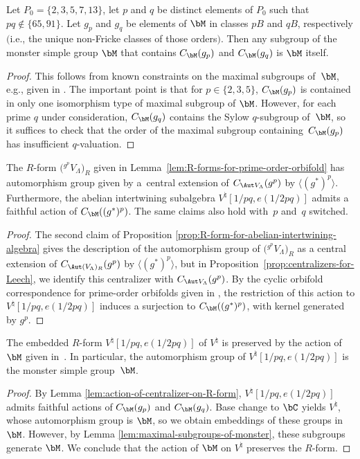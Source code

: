 \begin{lem} \label{lem:maximal-subgroups-of-monster}
Let $P_0 = \{ 2,3,5,7,13\}$, let $p$ and $q$ be distinct elements of $P_0$ such that $pq \not\in \{65, 91\}$. Let $g_p$ and $g_q$ be elements of $\bM$ in classes $pB$ and $qB$, respectively $($i.e., the unique non-Fricke classes of those orders$)$. Then any subgroup of the monster simple group $\bM$ that contains $C_\bM(g_p)$ and $C_\bM(g_q)$ is $\bM$ itself.
\end{lem}
\begin{proof}This follows from known constraints on the maximal subgroups of~$\bM$, e.g., given in \cite{W17}. The important point is that for $p \in \{2,3,5\}$, $C_\bM(g_p)$ is contained in only one isomorphism type of maximal subgroup of $\bM$. However, for each prime $q$ under consideration, $C_\bM(g_q)$ contains the Sylow $q$-subgroup of~$\bM$, so it suffices to check that the order of the maximal subgroup containing~$C_\bM(g_p)$ has insufficient $q$-valuation.
\end{proof}

\begin{lem} \label{lem:action-of-centralizer-on-R-form}The $R$-form $\big({}^{g^p}V_\Lambda\big)_R$ given in Lemma~{\rm \ref{lem:R-forms-for-prime-order-orbifold}} has automorphism group given by a~central extension of $C_{\Aut V_\Lambda}(g^p)$ by $\langle (g^*)^p \rangle$. Furthermore, the abelian intertwining subalgebra $V^\natural[1/pq,e(1/2pq)]$ admits a faithful action of $C_\bM((g^*)^p)$. The same claims also hold with~$p$ and~$q$ switched.
\end{lem}
\begin{proof}The second claim of Proposition \ref{prop:R-form-for-abelian-intertwining-algebra} gives the description of the automorphism group of $\big({}^{g^p}V_\Lambda\big)_R$ as a central extension of $C_{\Aut (V_\Lambda)_R}(g^p)$ by $\langle (g^*)^p \rangle$, but in Proposition~\ref{prop:centralizers-for-Leech}, we identify this centralizer with $C_{\Aut V_\Lambda}(g^p)$. By the cyclic orbifold correspondence for prime-order orbifolds given in \cite{ALY17}, the restriction of this action to $V^\natural[1/pq,e(1/2pq)]$ induces a surjection to $C_\bM((g^*)^p)$, with kernel generated by $g^p$.
\end{proof}

\begin{thm} \label{thm:monster-form}The embedded $R$-form $V^\natural[1/pq,e(1/2pq)]$ of $V^\natural$ is preserved by the action of $\bM$ given in~{\rm \cite{FLM88}}. In particular, the automorphism group of $V^\natural[1/pq,e(1/2pq)]$ is the monster simple group~$\bM$.
\end{thm}
\begin{proof}
By Lemma \ref{lem:action-of-centralizer-on-R-form}, $V^\natural[1/pq,e(1/2pq)]$ admits faithful actions of $C_\bM(g_p)$ and $C_\bM(g_q)$. Base change to $\bC$ yields $V^\natural$, whose automorphism group is $\bM$, so we obtain embeddings of these groups in $\bM$. However, by Lemma \ref{lem:maximal-subgroups-of-monster}, these subgroups generate $\bM$. We conclude that the action of $\bM$ on $V^\natural$ preserves the $R$-form.
\end{proof}

